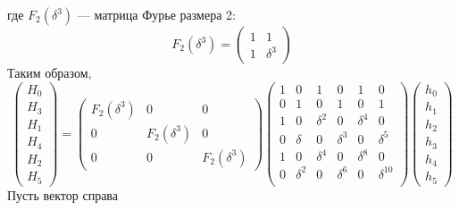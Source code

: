 где $F_2(\delta^3)$ --- матрица Фурье размера 2:
\[
    F_2(\delta^3)
    = \begin{pmatrix}
          1 & 1        \\
          1 & \delta^3
    \end{pmatrix}
\]
Таким образом,
\[
    \begin{pmatrix}
        H_0 \\
        H_3 \\
        H_1 \\
        H_4 \\
        H_2 \\
        H_5
    \end{pmatrix}
    =
    \begin{pmatrix}
        F_2(\delta^3) & 0             & 0             \\
        0             & F_2(\delta^3) & 0             \\
        0             & 0             & F_2(\delta^3)
    \end{pmatrix}
    \begin{pmatrix}
        1 & 0        & 1        & 0        & 1        & 0           \\
        0 & 1        & 0        & 1        & 0        & 1           \\
        1 & 0        & \delta^2 & 0        & \delta^4 & 0           \\
        0 & \delta   & 0        & \delta^3 & 0        & \delta^5    \\
        1 & 0        & \delta^4 & 0        & \delta^8 & 0           \\
        0 & \delta^2 & 0        & \delta^6 & 0        & \delta^{10} \\
    \end{pmatrix}
    \begin{pmatrix}
        h_0 \\
        h_1 \\
        h_2 \\
        h_3 \\
        h_4 \\
        h_5
    \end{pmatrix}
\]
Пусть вектор справа
